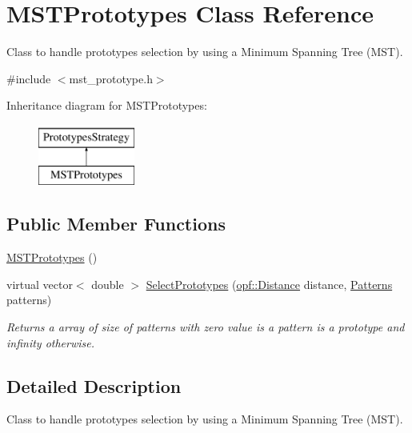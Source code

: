 \hypertarget{classMSTPrototypes}{\section{M\+S\+T\+Prototypes Class Reference}
\label{classMSTPrototypes}
}


Class to handle prototypes selection by using a Minimum Spanning Tree (M\+S\+T).  




{\ttfamily \#include $<$mst\+\_\+prototype.\+h$>$}

Inheritance diagram for M\+S\+T\+Prototypes\+:\begin{figure}[H]
\begin{center}
\leavevmode
\includegraphics[height=2.000000cm]{classMSTPrototypes}
\end{center}
\end{figure}
\subsection*{Public Member Functions}
\begin{DoxyCompactItemize}
\item 
\hyperlink{classMSTPrototypes_a62fedec88ad4ab417181fbc672f72410}{M\+S\+T\+Prototypes} ()
\item 
virtual vector$<$ double $>$ \hyperlink{classMSTPrototypes_a654ccbaebfdbca73a0da0e5eb1e4e39f}{Select\+Prototypes} (\hyperlink{namespaceopf_a61631393754e0aa6aaeacf0767b2b419}{opf\+::\+Distance} distance, \hyperlink{classPatterns}{Patterns} patterns)
\begin{DoxyCompactList}\small\item\em Returns a array of size of patterns with zero value is a pattern is a prototype and infinity otherwise. \end{DoxyCompactList}\end{DoxyCompactItemize}


\subsection{Detailed Description}
Class to handle prototypes selection by using a Minimum Spanning Tree (M\+S\+T). 

